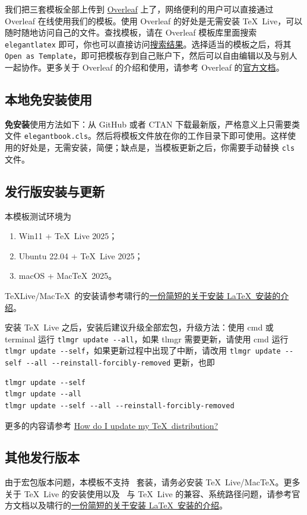我们把三套模板全部上传到 \href{https://www.overleaf.com/}{Overleaf} 上了，网络便利的用户可以直接通过 Overleaf 在线使用我们的模板。使用 Overleaf 的好处是无需安装 \TeX~Live，可以随时随地访问自己的文件。查找模板，请在 Overleaf 模板库里面搜索 \lstinline{elegantlatex} 即可，你也可以直接访问\href{https://www.overleaf.com/latex/templates?addsearch=elegantlatex}{搜索结果}。选择适当的模板之后，将其 \lstinline{Open as Template}，即可把模板存到自己账户下，然后可以自由编辑以及与别人一起协作。更多关于 Overleaf 的介绍和使用，请参考 Overleaf 的\href{https://www.overleaf.com/learn}{官方文档}。

\subsection{本地免安装使用}

\textbf{免安装}使用方法如下：从 GitHub 或者 CTAN 下载最新版，严格意义上只需要类文件 \lstinline{elegantbook.cls}。然后将模板文件放在你的工作目录下即可使用。这样使用的好处是，无需安装，简便；缺点是，当模板更新之后，你需要手动替换 \lstinline{cls} 文件。

\subsection{发行版安装与更新}

本模板测试环境为 
\begin{enumerate}
  \item Win11 + \TeX~Live 2025；
  \item Ubuntu 22.04 + \TeX~Live 2025；
  \item macOS + Mac\TeX\ 2025。
\end{enumerate}

\TeX Live/Mac\TeX\ 的安装请参考啸行的\href{https://github.com/OsbertWang/install-latex-guide-zh-cn/releases/}{一份简短的关于安装 \LaTeX\ 安装的介绍}。

安装 \TeX~Live 之后，安装后建议升级全部宏包，升级方法：使用 cmd 或 terminal 运行 \lstinline{tlmgr update --all}，如果 tlmgr 需要更新，请使用 cmd 运行 \lstinline{tlmgr update --self}，如果更新过程中出现了中断，请改用 \lstinline{tlmgr update --self --all --reinstall-forcibly-removed} 更新，也即

\begin{lstlisting}
tlmgr update --self 
tlmgr update --all
tlmgr update --self --all --reinstall-forcibly-removed
\end{lstlisting}

更多的内容请参考 \href{https://tex.stackexchange.com/questions/55437/how-do-i-update-my-tex-distribution}{How do I update my \TeX\ distribution?}

\subsection{其他发行版本}

由于宏包版本问题，本模板不支持 \CTeX\ 套装，请务必安装 \TeX~Live/Mac\TeX。更多关于 \TeX~Live 的安装使用以及 \CTeX\ 与 \TeX~Live 的兼容、系统路径问题，请参考官方文档以及啸行的\href{https://github.com/OsbertWang/install-latex-guide-zh-cn/releases/}{一份简短的关于安装 \LaTeX\ 安装的介绍}。



